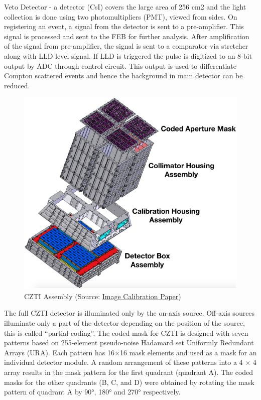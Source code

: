 \documentclass[11pt]{book} %
\begin{document}
Veto Detector - a detector (CsI) covers the large area of 256 cm2 and the light collection is done using two photomultipliers (PMT), viewed from sides. On registering an event, a signal from the detector is sent to a pre-amplifier. This signal is processed and sent to the FEB for further analysis. After amplification of the signal from pre-amplifier, the signal is sent to a comparator via stretcher along with LLD level signal. If LLD is triggered the pulse is digitized to an 8-bit output by ADC through control circuit. This output is used to differentiate Compton scattered events and hence the background in main detector can be reduced.

\begin{figure}
    \centering
    \includegraphics[scale=0.25]{Pictures/cztiassembly.png}
    \caption{CZTI Assembly (Source: \href{https://arxiv.org/pdf/2108.06746.pdf}{Image Calibration Paper})}
\end{figure}

The full CZTI detector is illuminated
only by the on-axis source. Off-axis sources illuminate
only a part of the detector depending on the position of
the source, this is called “partial coding”. The coded
mask for CZTI is designed with seven patterns based
on 255-element pseudo-noise Hadamard set Uniformly
Redundant Arrays (URA).  Each
pattern has 16×16 mask elements and used as a mask for an individual detector module. A random arrangement of these patterns into a 4 × 4 array results in the mask pattern for the first quadrant (quadrant A). The coded masks for the other quadrants (B, C, and D) were
obtained by rotating the mask pattern of quadrant A by
90°, 180° and 270° respectively.
\end{document}
